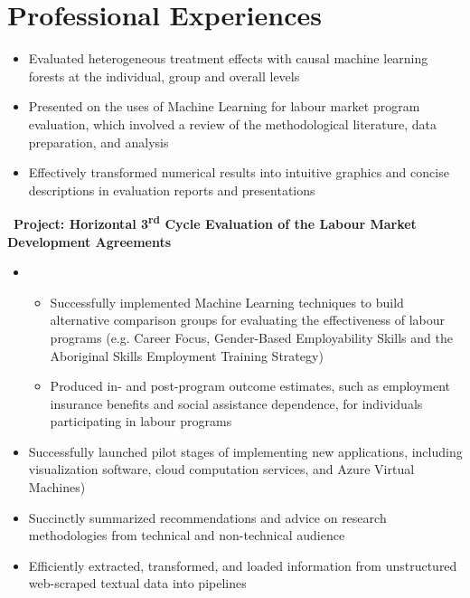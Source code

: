 \documentclass[12pt,a4paper,roman]{moderncv}        %
\begin{document}

\section{Professional Experiences}
\begin{itemize}
    \item Evaluated heterogeneous treatment effects with causal machine learning forests at the individual, group and overall levels
    \item Presented on the uses of Machine Learning for labour market program evaluation, which involved a review of the methodological literature, data preparation, and analysis
    \item Effectively transformed numerical results into intuitive graphics and concise descriptions in evaluation reports and presentations
\end{itemize}
\smallskip
\faBook \, \textbf{Project: Horizontal 3\textsuperscript{rd} Cycle Evaluation of the Labour Market Development Agreements}
\begin{itemize}
    \item[]\begin{itemize}
        \item Successfully implemented Machine Learning techniques to build alternative comparison groups for evaluating the effectiveness of labour programs (e.g. Career Focus, Gender-Based Employability Skills and the Aboriginal Skills Employment Training Strategy)
        \item Produced in- and post-program outcome estimates, such as employment insurance benefits and social assistance dependence, for individuals participating in labour programs
        \end{itemize}
\end{itemize}
\bigskip
{}
\begin{itemize}
    \item Successfully launched pilot stages of implementing new applications, including visualization software, cloud computation services, and Azure Virtual Machines)
    \item Succinctly summarized recommendations and advice on research methodologies from technical and non-technical audience 
    \item Efficiently extracted, transformed, and loaded information from unstructured web-scraped textual data into pipelines
\end{itemize}
\end{document}
